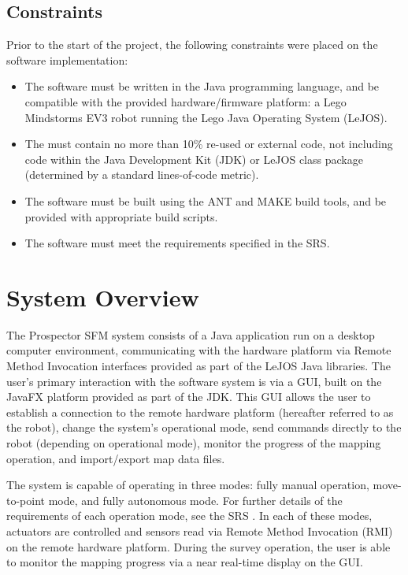 \documentclass[12pt]{article}
\begin{document}
\subsection{Constraints}
Prior to the start of the project, the following constraints were placed on the software implementation:
\begin{itemize}
\item The software must be written in the Java programming language, and be compatible with the provided hardware/firmware platform: a Lego Mindstorms EV3 robot running the Lego Java Operating System (LeJOS).
\item The must contain no more than 10\% re-used or external code, not including code within the Java Development Kit (JDK) or LeJOS class package (determined by a standard lines-of-code metric).
\item The software must be built using the ANT and MAKE build tools, and be provided with appropriate build scripts.
\item The software must meet the requirements specified in the SRS.
\end{itemize}

\section{System Overview}

The Prospector SFM system consists of a Java application run on a desktop computer environment, communicating with the hardware platform via Remote Method Invocation interfaces provided as part of the LeJOS Java libraries. 
The user's primary interaction with the software system is via a GUI, built on the JavaFX platform provided as part of the JDK. This GUI allows the user to establish a connection to the remote hardware platform (hereafter referred to as the robot), change the system's operational mode, send commands directly to the robot (depending on operational mode), monitor the progress of the mapping operation, and import/export map data files.

The system is capable of operating in three modes: fully manual operation, move-to-point mode, and fully autonomous mode. For further details of the requirements of each operation mode, see the SRS \cite{srs}. In each of these modes, actuators are controlled and sensors read via Remote Method Invocation (RMI) on the remote hardware platform. During the survey operation, the user is able to monitor the mapping progress via a near real-time display on the GUI.
\end{document}
